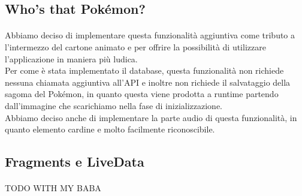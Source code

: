 \documentclass[a4paper,11pt]{article}
\begin{document}
				\subsection{Who's that Pokémon?}
					\paragraph{}
						Abbiamo deciso di implementare questa funzionalità aggiuntiva come tributo a l’intermezzo del cartone animato e per offrire la possibilità di utilizzare l’applicazione in maniera più ludica.\\
						Per come è stata implementato il database, questa funzionalità non richiede nessuna chiamata aggiuntiva all’API e inoltre non richiede il salvataggio della sagoma del Pokémon, in quanto questa viene prodotta a runtime partendo dall’immagine che scarichiamo nella fase di inizializzazione.\\
						Abbiamo deciso anche di implementare la parte audio di questa funzionalità, in quanto elemento cardine e molto facilmente riconoscibile.\\
				\subsection{Fragments e LiveData}
					\paragraph{}
						TODO WITH MY BABA
				\newpage

				
  						
\end{document}
